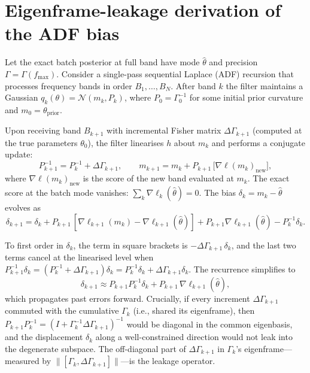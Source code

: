 \documentclass[twocolumn,prd,showpacs,superscriptaddress]{revtex4-2}
\begin{document}
\appendix

\section{Eigenframe-leakage derivation of the ADF bias}
\label{sec:appendix}

Let the exact batch posterior at full band have mode $\hat\theta$ and
precision $\Gamma = \Gamma(f_{\text{max}})$.  Consider a single-pass
sequential Laplace (ADF) recursion that processes frequency bands in
order $B_1, \ldots, B_N$.  After band $k$ the filter maintains a
Gaussian $q_k(\theta) = \mathcal{N}(m_k, P_k)$, where $P_0 = \Gamma_0^{-1}$
for some initial prior curvature and $m_0 = \theta_{\text{prior}}$.

Upon receiving band $B_{k+1}$ with incremental Fisher matrix
$\Delta\Gamma_{k+1}$ (computed at the true parameters $\theta_0$),
the filter linearises $h$ about $m_k$ and performs a conjugate update:
\begin{equation}
P_{k+1}^{-1} = P_k^{-1} + \Delta\Gamma_{k+1}, \qquad
m_{k+1} = m_k + P_{k+1}\,\bigl[\nabla\ell(m_k)_{\text{new}}\bigr],
\label{eq:adf_update}
\end{equation}
where $\nabla\ell(m_k)_{\text{new}}$ is the score of the new band
evaluated at $m_k$.  The exact score at the batch mode vanishes:
$\sum_k \nabla\ell_k(\hat\theta) = 0$.  The bias $\delta_k = m_k - \hat\theta$
evolves as
\begin{equation}
\delta_{k+1} = \delta_k + P_{k+1}\,[\nabla\ell_{k+1}(m_k)
- \nabla\ell_{k+1}(\hat\theta)] + P_{k+1}\nabla\ell_{k+1}(\hat\theta)
- P_k^{-1}\delta_k .
\label{eq:bias_recurrence}
\end{equation}

To first order in $\delta_k$, the term in square brackets is
$-\Delta\Gamma_{k+1}\,\delta_k$, and the last two terms cancel at
the linearised level when $P_{k+1}^{-1}\delta_k = (P_k^{-1} +
\Delta\Gamma_{k+1})\delta_k = P_k^{-1}\delta_k + \Delta\Gamma_{k+1}\delta_k$.
The recurrence simplifies to
\begin{equation}
\delta_{k+1} \approx P_{k+1}P_k^{-1}\delta_k
+ P_{k+1}\,\nabla\ell_{k+1}(\hat\theta),
\label{eq:bias_simple}
\end{equation}
which propagates past errors forward.  Crucially, if every increment
$\Delta\Gamma_{k+1}$ commuted with the cumulative $\Gamma_k$ (i.e.,
shared its eigenframe), then $P_{k+1}P_k^{-1} = (I + \Gamma_k^{-1}
\Delta\Gamma_{k+1})^{-1}$ would be diagonal in the common eigenbasis,
and the displacement $\delta_k$ along a well-constrained direction
would not leak into the degenerate subspace.  The off-diagonal part of
$\Delta\Gamma_{k+1}$ in $\Gamma_k$'s eigenframe---measured by
$\|[\Gamma_k, \Delta\Gamma_{k+1}]\|$---is the leakage operator.
\end{document}
